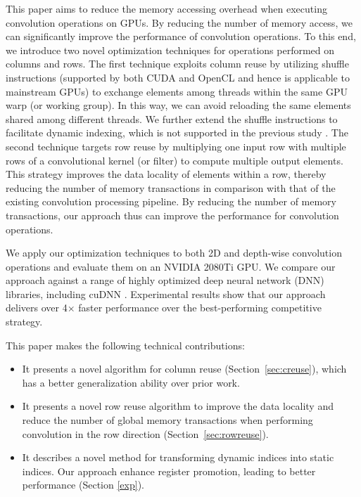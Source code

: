 This paper aims to reduce the memory accessing overhead when executing convolution operations on GPUs. By reducing the number of memory
access, we can significantly improve the performance of convolution operations. To this end, we introduce two novel optimization techniques
for operations performed on columns and rows. The first technique exploits column reuse by utilizing shuffle instructions (supported by
both CUDA and OpenCL and hence is applicable to mainstream GPUs) to exchange elements among threads within the same GPU warp (or working
group). In this way, we can avoid reloading the same elements shared among different threads. We further extend the shuffle instructions to
facilitate dynamic indexing, which is not supported in the previous study \cite{vasilache2014fast}. The second technique targets row reuse
by multiplying one input row with multiple rows of a convolutional kernel (or filter) to compute multiple output elements. This strategy
improves the data locality of elements within a row, thereby reducing the number of memory transactions in comparison with that of the
existing convolution processing pipeline. By reducing the number of memory transactions, our approach thus can improve the performance for
convolution operations.

We apply our optimization techniques to both 2D and depth-wise convolution operations and evaluate them on an NVIDIA 2080Ti GPU. We compare
our approach against a range of highly optimized  deep neural network (DNN) libraries, including cuDNN \cite{ChetlurWVCTCS14}. Experimental
results show that our approach delivers over 4$\times$ faster performance over the best-performing competitive strategy.

This paper makes the following technical contributions:
\begin{itemize}
  \item It presents a novel algorithm for column reuse (Section~\ref{sec:creuse}), which has a better generalization
      ability over prior work.
  \item It presents a novel row reuse algorithm to improve the data locality and reduce the number of global memory transactions when
      performing convolution in the row direction (Section~\ref {sec:rowreuse}).
  \item It describes a novel method for transforming dynamic indices into static indices. Our approach enhance register promotion,
      leading to better performance (Section \ref{exp}).
\end{itemize}
